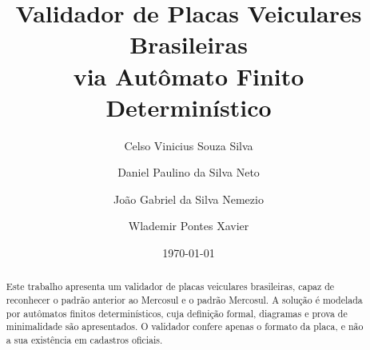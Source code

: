 \documentclass[12pt,a4paper]{article}
\title{Validador de Placas Veiculares Brasileiras\\
       via Autômato Finito Determinístico}
\author{Celso Vinicius Souza Silva \and Daniel Paulino da Silva Neto \and João Gabriel da Silva Nemezio \and Wlademir Pontes Xavier}
\date{\today}
\begin{document}
\maketitle
\begin{abstract}
Este trabalho apresenta um validador de placas veiculares
brasileiras, capaz de reconhecer o padrão anterior ao Mercosul e o padrão
Mercosul. A solução é modelada por autômatos finitos
determinísticos, cuja definição formal, diagramas e prova de
minimalidade são apresentados. O validador confere apenas o
formato da placa, e não a sua existência em cadastros oficiais.
\end{abstract}













\end{document}
